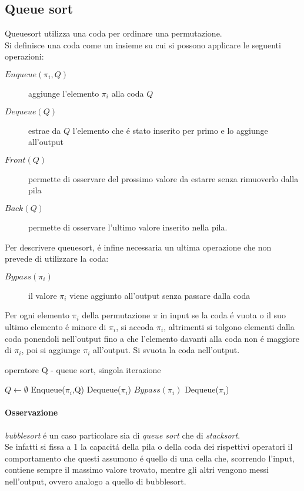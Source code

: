 \subsection*{Queue sort}
Queuesort utilizza una coda per ordinare una permutazione.\\
Si definisce una coda come un insieme su cui si possono applicare le seguenti operazioni:
\begin{description}
   \item[$Enqueue(\pi_i,Q)$] aggiunge l'elemento $\pi_i$ alla coda $Q$
   \item[$Dequeue(Q)$] estrae da $Q$ l'elemento che \'e stato inserito per primo e lo aggiunge all'output
   \item[$Front(Q)$] permette di osservare del prossimo valore da estarre senza rimuoverlo dalla pila
   \item[$Back(Q)$] permette di osservare l'ultimo valore inserito nella pila.
\end{description}
Per descrivere queuesort, \'e infine necessaria un ultima operazione che non prevede di utilizzare la coda:\begin{description}\item[$Bypass(\pi_i)$] il valore $\pi_i$ viene aggiunto all'output senza passare dalla coda\end{description}
Per ogni elemento $\pi_i$ della permutazione $\pi$ in input se la coda \'e vuota o il suo ultimo elemento \'e minore di $\pi_i$, si accoda $\pi_i$, altrimenti si tolgono elementi dalla coda ponendoli nell'output fino a che l'elemento davanti  alla coda non \'e maggiore di $\pi_i$, poi si aggiunge $\pi_i$ all'output. Si svuota la coda nell'output. 
\begin{algorithm}[H]
   \caption{operatore Q - queue sort, singola iterazione}
\begin{algorithmic}[1]
\State $Q\leftarrow\emptyset$
\State Enqueue($\pi_i$,Q)
\Else
{}
\State Dequeue($\pi_i$)
\EndWhile
\State $Bypass(\pi_i)$
\EndIf
\EndFor
{}
\State Dequeue($\pi_i$)
\EndWhile
\end{algorithmic}
\end{algorithm}
\paragraph*{Osservazione}\textit{bubblesort} \'e un caso particolare sia di \textit{queue sort} che di \textit{stacksort}.\\
Se infatti si fissa a 1 la capacit\'a della pila o della coda dei rispettivi operatori il comportamento che questi assumono \'e quello di una cella che, scorrendo l'input, contiene sempre il massimo valore trovato, mentre gli altri vengono messi nell'output, ovvero analogo a quello di bubblesort.
